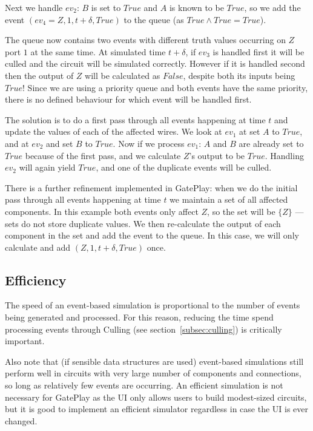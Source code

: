 Next we handle $ev_2$: $B$ is set to $True$ and $A$ is known to be $True$, so we add the event $(ev_4 = Z, 1, t + \delta, True)$ to the queue (as $True \land True = True$).

The queue now contains two events with different truth values occurring on $Z$ port $1$ at the same time. At simulated time $t + \delta$, if $ev_3$ is handled first it will be culled and the circuit will be simulated correctly. However if it is handled second then the output of $Z$ will be calculated as $False$, despite both its inputs being $True$! Since we are using a priority queue and both events have the same priority, there is no defined behaviour for which event will be handled first.

The solution is to do a first pass through all events happening at time $t$ and update the values of each of the affected wires. We look at $ev_1$ at set $A$ to $True$, and at $ev_2$ and set $B$ to $True$. Now if we process $ev_1$: $A$ and $B$ are already set to $True$ because of the first pass, and we calculate $Z$'s output to be $True$. Handling $ev_2$ will again yield $True$, and one of the duplicate events will be culled.

There is a further refinement implemented in GatePlay: when we do the initial pass through all events happening at time $t$ we maintain a set  of all affected components. In this example both events only affect $Z$, so the set will be $\{Z\}$ --- sets do not store duplicate values. We then re-calculate the output of each component in the set and add the event to the queue. In this case, we will only calculate and add $(Z, 1, t + \delta, True)$ once.

\subsection{Efficiency}
The speed of an event-based simulation is proportional to the number of events being generated and processed. For this reason, reducing the time spend processing events through Culling (see section~\ref{subsec:culling}) is critically important.

Also note that (if sensible data structures are used) event-based simulations still perform well in circuits with very large number of components and connections, so long as relatively few events are occurring. An efficient simulation is not necessary for GatePlay as the UI only allows users to build modest-sized circuits, but it is good to implement an efficient simulator regardless in case the UI is ever changed.

